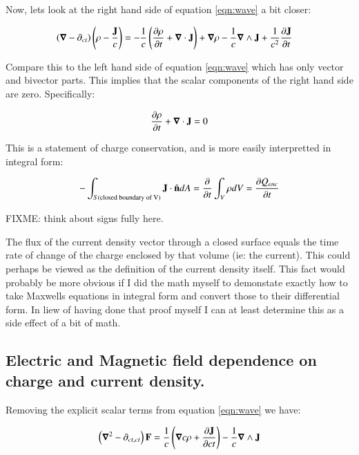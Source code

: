 \documentclass{article}
\newcommand{\spacegrad}[0]{\boldsymbol{\nabla}}
\begin{document}
Now, lets look at the right hand side of equation \ref{eqn:wave} a bit closer:

\begin{align*}
\left(\spacegrad -\partial_{ct} \right) \left(\rho - \frac{\BJ}{c}\right) 
&= - \inv{c}\left(\frac{\partial \rho}{\partial t} + \spacegrad \cdot \BJ \right) + \spacegrad \rho - \inv{c}\spacegrad \wedge \BJ + \inv{c^2}\frac{\partial \BJ}{\partial t}
\end{align*}

Compare this to the left hand side of equation \ref{eqn:wave} which has only vector and bivector parts.  This implies that the scalar components of the right hand side are zero.  Specifically:

\begin{equation*}
\frac{\partial \rho}{\partial t} + \spacegrad \cdot \BJ = 0
\end{equation*}

This is a statement of charge conservation, and is more easily interpretted in integral form:

\begin{equation}
-\int_{S(\text{closed boundary of V})} \mathbf{J} \cdot \hat{\mathbf{n}} dA = \frac{\partial}{\partial t} \int_V \rho dV = \frac{\partial Q_{enc}}{\partial t}
\end{equation}

FIXME: think about signs fully here.

The flux of the current density vector through a closed surface equals the time rate of change of the charge enclosed by that volume (ie: the current).  This could perhaps be viewed as the definition of the current density itself.  This fact would probably be more obvious if I did the math myself to demonstate exactly how to take Maxwells equations in integral form and convert those to their differential form.  In liew of having done that proof myself I can at least determine this as a side effect of a bit of math.

\subsection{ Electric and Magnetic field dependence on charge and current density. }

Removing the explicit scalar terms from equation \ref{eqn:wave} we have:

\begin{equation*}
\left(\spacegrad^2 - \partial_{ct, ct}\right) \BF =
\inv{c } \left(\spacegrad c \rho + \frac{\partial \BJ}{\partial c t} \right)
- \inv{c } \spacegrad \wedge \BJ
\end{equation*}
\end{document}
